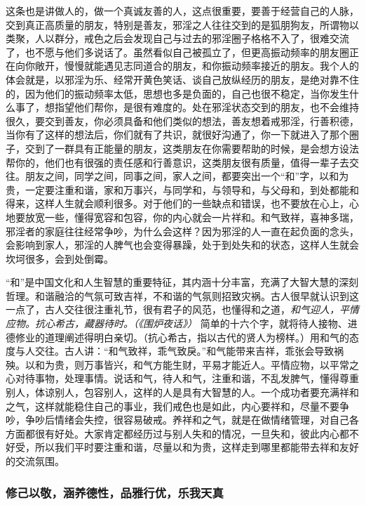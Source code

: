 这条也是讲做人的，做一个真诚友善的人，这点很重要，要善于经营自己的人脉，交到真正高质量的朋友，特别是善友，邪淫之人往往交到的是狐朋狗友，所谓物以类聚，人以群分，戒色之后会发现自己与过去的邪淫圈子格格不入了，很难交流了，也不愿与他们多说话了。虽然看似自己被孤立了，但更高振动频率的朋友圈正在向你敞开，慢慢就能遇见志同道合的朋友，和你振动频率接近的朋友。我个人的体会就是，以邪淫为乐、经常开黄色笑话、谈自己放纵经历的朋友，是绝对靠不住的，因为他们的振动频率太低，思想也多是负面的，自己也很不稳定，当你发生什么事了，想指望他们帮你，是很有难度的。处在邪淫状态交到的朋友，也不会维持很久，要交到善友，你必须具备和他们类似的想法，善友想着戒邪淫，行善积德，当你有了这样的想法后，你们就有了共识，就很好沟通了，你一下就进入了那个圈子，交到了一群具有正能量的朋友，这类朋友在你需要帮助的时候，是会想方设法帮你的，他们也有很强的责任感和行善意识，这类朋友很有质量，值得一辈子去交往。朋友之间，同学之间，同事之间，家人之间，都要突出一个“和”字，以和为贵，一定要注重和谐，家和万事兴，与同学和，与领导和，与父母和，到处都能和得来，这样人生就会顺利很多。对于他们的一些缺点和错误，也不要放在心上，心地要放宽一些，懂得宽容和包容，你的内心就会一片祥和。和气致祥，喜神多瑞，邪淫者的家庭往往经常争吵，为什么会这样？因为邪淫的人一直在起负面的念头，会影响到家人，邪淫的人脾气也会变得暴躁，处于到处失和的状态，这样人生就会坎坷很多，会到处倒霉。

“和”是中国文化和人生智慧的重要特征，其内涵十分丰富，充满了大智大慧的深刻哲理。和谐融洽的气氛可致吉祥，不和谐的气氛则招致灾祸。古人很早就认识到这一点了，古人交往很注重礼节，很有君子的风范，也懂得和之道，\textit{和气迎人，平情应物。抗心希古，藏器待时。（《围炉夜话》）} 简单的十六个字，就将待人接物、进德修业的道理阐述得明白亲切。（抗心希古，指以古代的贤人为榜样。）用和气的态度与人交往。古人讲：“和气致祥，乖气致戾。”和气能带来吉祥，乖张会导致祸殃。以和为贵，则万事皆兴，和气方能生财，平易才能近人。平情应物，以平常之心对待事物，处理事情。说话和气，待人和气，注重和谐，不乱发脾气，懂得尊重别人，体谅别人，包容别人，这样的人是具有大智慧的人。一个成功者要充满祥和之气，这样就能稳住自己的事业，我们戒色也是如此，内心要祥和，尽量不要争吵，争吵后情绪会失控，很容易破戒。养祥和之气，就是在做情绪管理，对自己各方面都很有好处。大家肯定都经历过与别人失和的情况，一旦失和，彼此内心都不好受，所以我们平时要注重和谐，尽量以和为贵，这样走到哪里都能带去祥和友好的交流氛围。

\subsubsection{修己以敬，涵养德性，品雅行优，乐我天真}

